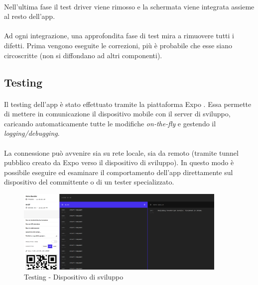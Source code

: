 \documentclass[11pt,a4paper,english]{article}
\begin{document}
\paragraph{} Nell'ultima fase il test driver viene rimosso e la schermata viene integrata assieme al resto dell'app. 

\paragraph{} Ad ogni integrazione, una approfondita fase di test mira a rimuovere tutti i difetti. Prima vengono eseguite le correzioni, più è probabile che esse siano circoscritte (non si diffondano ad altri componenti).

\subsection{Testing}

\paragraph{} Il testing dell'app è stato effettuato tramite la piattaforma Expo \cite{expo}. Essa permette di mettere in comunicazione il dispositivo mobile con il server di sviluppo, caricando automaticamente tutte le modifiche \emph{on-the-fly} e gestendo il \emph{logging/debugging}.

\paragraph{} La connessione può avvenire sia su rete locale, sia da remoto (tramite tunnel pubblico creato da Expo verso il dispositivo di sviluppo). In questo modo è possibile eseguire ed esaminare il comportamento dell'app direttamente sul dispositivo del committente o di un tester specializzato.  

\begin{figure}[H]
    \centering
    \includegraphics[width=0.9\textwidth]{img/debug_app_pc.png}
    \caption{Testing - Dispositivo di sviluppo}
\end{figure}
\end{document}
